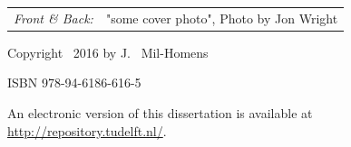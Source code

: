 \begin{titlepage}
\begin{tabular}{@{}p{}@{}p{}}
    \textit{Front \& Back:} & "some cover photo", Photo by Jon Wright
\end{tabular}

\vspace{4\bigskipamount}

\noindent Copyright \textcopyright\ 2016 by J. ~Mil-Homens


\medskip
\noindent ISBN 978-94-6186-616-5

\medskip
\noindent An electronic version of this dissertation is available at \\
\url{http://repository.tudelft.nl/}.

\end{titlepage}
